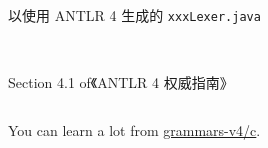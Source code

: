 \begin{frame}{}
  \begin{center}
    以使用 ANTLR 4 生成的 \texttt{xxxLexer.java}
  \end{center}

  \begin{columns}
      \pause
      \pause
  \end{columns}
\end{frame}

\begin{frame}{}
  \begin{center}
     \\[10pt]

    Section 4.1  of《ANTLR 4 权威指南》
  \end{center}

  \begin{columns}
  \end{columns}
\end{frame}

\begin{frame}{}
  \begin{center}
    You can learn a lot from \href{https://github.com/antlr/grammars-v4/tree/master/c}{grammars-v4/c}.
  \end{center}
\end{frame}

\begin{frame}{}
\end{frame}
